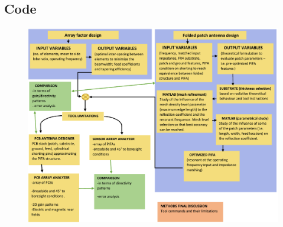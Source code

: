 \documentclass[10pt,a4paper,twocolumn]{article}
\begin{document}
{\subsection*{Code}
\begin{figure}
		\includegraphics[scale=0.48]{workflow.pdf}
\end{figure}
}
\end{document}
